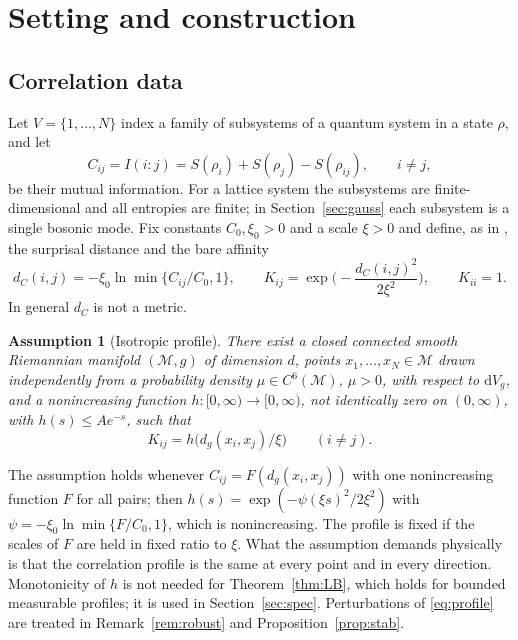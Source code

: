 \documentclass[11pt,a4paper]{article}
\theoremstyle{stmt}
\theoremstyle{defn}
\newtheorem{assumption}[theorem]{Assumption}
\theoremstyle{rmk}
\numberwithin{equation}{section}
\newcommand{\M}{\mathcal{M}}
\newcommand{\dd}{\mathrm{d}}
\begin{document}
\section{Setting and construction}\label{sec:setting}

\subsection{Correlation data}

Let $V=\{1,\dots,N\}$ index a family of subsystems of a quantum system in a state $\rho$, and let
\begin{equation}
C_{ij}=I(i:j)=S(\rho_i)+S(\rho_j)-S(\rho_{ij}),\qquad i\ne j,
\end{equation}
be their mutual information. For a lattice system the subsystems are finite-dimensional and all entropies are finite; in Section~\ref{sec:gauss} each subsystem is a single bosonic mode. Fix constants $C_0,\xi_0>0$ and a scale $\xi>0$ and define, as in \cite{CCM}, the surprisal distance and the bare affinity
\begin{equation}\label{eq:surprisal}
d_C(i,j)=-\xi_0\ln\min\{C_{ij}/C_0,1\},\qquad K_{ij}=\exp\!\Big(-\frac{d_C(i,j)^2}{2\xi^2}\Big),\qquad K_{ii}=1 .
\end{equation}
In general $d_C$ is not a metric.

\begin{assumption}[Isotropic profile]\label{ass:profile}
There exist a closed connected smooth Riemannian manifold $(\M,g)$ of dimension $d$, points $x_1,\dots,x_N\in\M$ drawn independently from a probability density $\mu\in C^6(\M)$, $\mu>0$, with respect to $\dd V_g$, and a nonincreasing function $h:[0,\infty)\to[0,\infty)$, not identically zero on $(0,\infty)$, with $h(s)\le A e^{-s}$, such that
\begin{equation}\label{eq:profile}
K_{ij}=h\big(d_g(x_i,x_j)/\xi\big)\qquad (i\ne j).
\end{equation}
\end{assumption}

The assumption holds whenever $C_{ij}=F(d_g(x_i,x_j))$ with one nonincreasing function $F$ for all pairs; then $h(s)=\exp(-\psi(\xi s)^2/2\xi^2)$ with $\psi=-\xi_0\ln\min\{F/C_0,1\}$, which is nonincreasing. The profile is fixed if the scales of $F$ are held in fixed ratio to $\xi$. What the assumption demands physically is that the correlation profile is the same at every point and in every direction. Monotonicity of $h$ is not needed for Theorem~\ref{thm:LB}, which holds for bounded measurable profiles; it is used in Section~\ref{sec:spec}. Perturbations of \eqref{eq:profile} are treated in Remark~\ref{rem:robust} and Proposition~\ref{prop:stab}.
\end{document}
